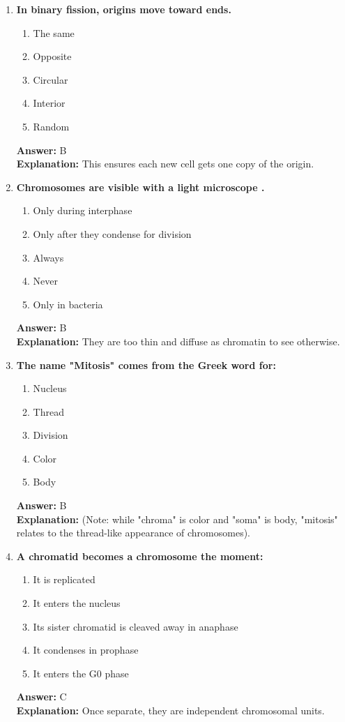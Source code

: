 \documentclass[11pt, a4paper]{article}
\begin{document}
\begin{enumerate}[leftmargin=*, label=\arabic*.]
\item \textbf{In binary fission, origins move toward \underline{\hspace{1cm}} ends.}
\begin{enumerate}[label=\Alph*.]
\item The same
\item Opposite
\item Circular
\item Interior
\item Random
\end{enumerate}
\textbf{Answer:} B \\
\textbf{Explanation:} This ensures each new cell gets one copy of the origin.

\item \textbf{Chromosomes are visible with a light microscope \underline{\hspace{1cm}}.}
\begin{enumerate}[label=\Alph*.]
\item Only during interphase
\item Only after they condense for division
\item Always
\item Never
\item Only in bacteria
\end{enumerate}
\textbf{Answer:} B \\
\textbf{Explanation:} They are too thin and diffuse as chromatin to see otherwise.

\item \textbf{The name "Mitosis" comes from the Greek word for:}
\begin{enumerate}[label=\Alph*.]
\item Nucleus
\item Thread
\item Division
\item Color
\item Body
\end{enumerate}
\textbf{Answer:} B \\
\textbf{Explanation:} (Note: while "chroma" is color and "soma" is body, "mitosis" relates to the thread-like appearance of chromosomes).

\item \textbf{A chromatid becomes a chromosome the moment:}
\begin{enumerate}[label=\Alph*.]
\item It is replicated
\item It enters the nucleus
\item Its sister chromatid is cleaved away in anaphase
\item It condenses in prophase
\item It enters the G0 phase
\end{enumerate}
\textbf{Answer:} C \\
\textbf{Explanation:} Once separate, they are independent chromosomal units.


\end{enumerate}
\end{document}
